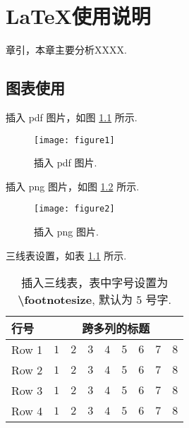 {

\chapter{LaTeX使用说明}\label{chap:chapter1}
{
章引，本章主要分析XXXX.

\section{图表使用}

插入 pdf 图片，如图 \ref{fig:figure1} 所示.
\begin{figure}[!htbp]
    \centering
    \texttt{[image: figure1]}
    \caption{插入 pdf 图片.}
    \label{fig:figure1}
\end{figure}

插入 png 图片，如图 \ref{fig:figure2} 所示.
\begin{figure}[!htbp]
    \centering
    \texttt{[image: figure2]}
    \caption{插入 png 图片.}
    \label{fig:figure2}
\end{figure}

三线表设置，如表 \ref{tab:table1} 所示.
\begin{table}[!htbp]
    \caption{插入三线表，表中字号设置为 \textbf{\backslash footnotesize}, 默认为 5 号字.}
    \label{tab:table1}
    \centering
    \footnotesize%
    \setlength{\tabcolsep}{4pt}%
    \begin{tabular}{lcccccccc}
        \toprule
        行号 & \multicolumn{8}{c}{跨多列的标题}\\
        \midrule
        Row 1 & $1$ & $2$ & $3$ & $4$ & $5$ & $6$ & $7$ & $8$\\
        Row 2 & $1$ & $2$ & $3$ & $4$ & $5$ & $6$ & $7$ & $8$\\
        Row 3 & $1$ & $2$ & $3$ & $4$ & $5$ & $6$ & $7$ & $8$\\
        Row 4 & $1$ & $2$ & $3$ & $4$ & $5$ & $6$ & $7$ & $8$\\
        \bottomrule
    \end{tabular}
\end{table}

}}
